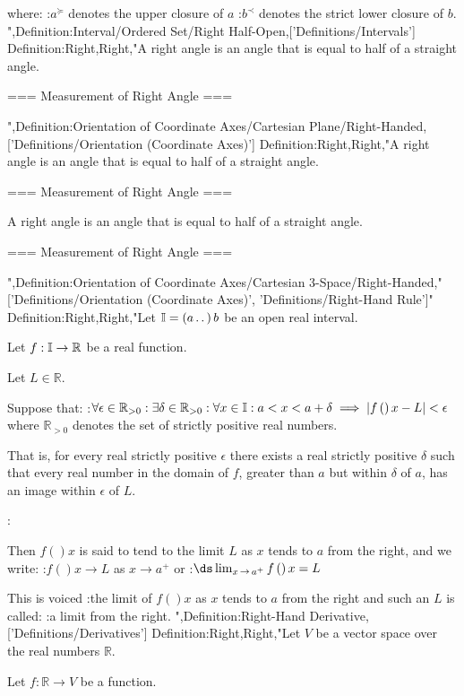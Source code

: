 where:
:$a^\succcurlyeq$ denotes the upper closure of $a$
:$b^\prec$ denotes the strict lower closure of $b$.
",Definition:Interval/Ordered Set/Right Half-Open,['Definitions/Intervals']
Definition:Right,Right,"A right angle is an angle that is equal to half of a straight angle.


=== Measurement of Right Angle ===

",Definition:Orientation of Coordinate Axes/Cartesian Plane/Right-Handed,['Definitions/Orientation (Coordinate Axes)']
Definition:Right,Right,"A right angle is an angle that is equal to half of a straight angle.


=== Measurement of Right Angle ===

A right angle is an angle that is equal to half of a straight angle.


=== Measurement of Right Angle ===

",Definition:Orientation of Coordinate Axes/Cartesian 3-Space/Right-Handed,"['Definitions/Orientation (Coordinate Axes)', 'Definitions/Right-Hand Rule']"
Definition:Right,Right,"Let $\Bbb I = \left( a \,.\,.\,   \right)b$ be an open real interval.

Let $f: \Bbb I \to \mathbb R$ be a real function.

Let $L \in \mathbb R$.


Suppose that:
:$\forall \epsilon \in \mathbb R_{>0}: \exists \delta \in \mathbb R_{>0}: \forall x \in \Bbb I: a < x < a + \delta \implies \left\lvert f \left(   \right)x - L \right\rvert < \epsilon$
where $\mathbb R_{>0}$ denotes the set of strictly positive real numbers.

That is, for every real strictly positive $\epsilon$ there exists a real strictly positive $\delta$ such that every real number in the domain of $f$, greater than $a$ but within $\delta$ of $a$, has an image within $\epsilon$ of $L$.


:

Then $f \left(   \right)x$ is said to tend to the limit $L$ as $x$ tends to $a$ from the right, and we write:
:$f \left(   \right)x \to L$ as $x \to a^+$
or
:$\ds \lim_{x \mathop \to a^+} f \left(   \right)x = L$


This is voiced
:the limit of $f \left(   \right)x$ as $x$ tends to $a$ from the right
and such an $L$ is called:
:a limit from the right.
",Definition:Right-Hand Derivative,['Definitions/Derivatives']
Definition:Right,Right,"Let $V$ be a vector space over the real numbers $\mathbb R$.

Let $f: \mathbb R \to V$ be a function.


